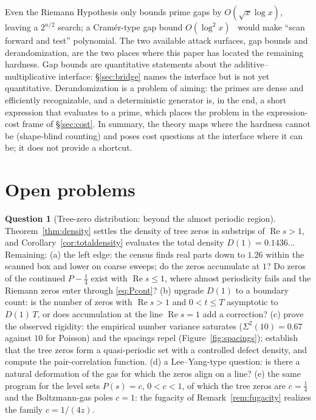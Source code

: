 \documentclass[11pt]{article}
\numberwithin{equation}{section}
\theoremstyle{plain}
\theoremstyle{definition}
\newtheorem{question}[theorem]{Question}
\theoremstyle{remark}
\begin{document}
Even the Riemann Hypothesis only bounds prime gaps by $O(\sqrt{x}\log x)$, leaving a
$2^{n/2}$ search; a Cram\'er-type gap bound $O(\log^2 x)$~\cite{cramer} would make
``scan forward and test'' polynomial. The two available attack surfaces, gap bounds
and derandomization, are the two places where this paper has located the remaining
hardness. Gap bounds are quantitative statements about the additive--multiplicative
interface: \S\ref{sec:bridge} names the interface but is not yet quantitative.
Derandomization is a problem of aiming: the primes are dense and efficiently
recognizable, and a deterministic generator is, in the end, a short expression that
evaluates to a prime, which places the problem in the expression-cost frame of
\S\ref{sec:cost}. In summary, the theory maps where the hardness cannot be
(shape-blind counting) and poses cost questions at the interface where it can be; it
does not provide a shortcut.

\section{Open problems}\label{sec:open}

\begin{question}[Tree-zero distribution: beyond the almost periodic region]
\label{prob:zeros}
Theorem~\ref{thm:density} settles the density of tree zeros in substrips of
$\operatorname{Re} s > 1$, and Corollary~\ref{cor:totaldensity} evaluates the total
density $D(1) = 0.1436\dots$ Remaining: (a) the left edge: the census finds real
parts down to $1.26$ within the scanned box and lower on coarse sweeps; do the zeros
accumulate at $1$? Do zeros of the continued $P - \tfrac14$ exist with
$\operatorname{Re} s \le 1$, where almost periodicity fails and the Riemann zeros
enter through \eqref{eq:Pcont}? (b) upgrade $D(1)$ to a boundary count: is the number
of zeros with $\operatorname{Re} s > 1$ and $0 < t \le T$ asymptotic to $D(1)\,T$, or
does accumulation at the line $\operatorname{Re} s = 1$ add a correction? (c) prove
the observed rigidity: the empirical number variance saturates
($\Sigma^2(10) = 0.67$ against $10$ for Poisson) and the spacings repel
(Figure~\ref{fig:spacings}); establish that the tree zeros form a quasi-periodic set
with a controlled defect density, and compute the pair-correlation function.
(d) a Lee--Yang-type question: is there a natural deformation of the gas for which
the zeros align on a line? (e) the same program for the level sets
$P(s) = c$, $0 < c < 1$, of which the tree zeros are $c = \tfrac14$ and the
Boltzmann-gas poles $c = 1$: the fugacity of Remark~\ref{rem:fugacity} realizes the
family $c = 1/(4z)$.
\end{question}
\end{document}
